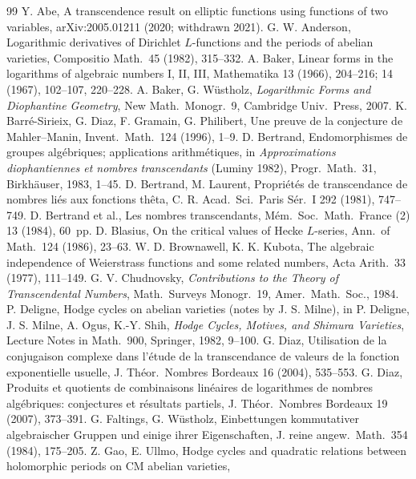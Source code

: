 \documentclass[11pt]{amsart}
\theoremstyle{definition}
\begin{document}
\begin{thebibliography}{99}
 Y. Abe, A transcendence result on elliptic functions using functions of two variables,
arXiv:2005.01211 (2020; withdrawn 2021).
 G. W. Anderson, Logarithmic derivatives of Dirichlet $L$-functions and the periods of abelian varieties,
Compositio Math.\ 45 (1982), 315--332.
 A. Baker, Linear forms in the logarithms of algebraic numbers I, II, III, Mathematika 13 (1966),
204--216; 14 (1967), 102--107, 220--228.
 A. Baker, G. W\"ustholz, \emph{Logarithmic Forms and Diophantine Geometry}, New Math.\ Monogr.\ 9,
Cambridge Univ.\ Press, 2007.
 K. Barr\'e-Sirieix, G. Diaz, F. Gramain, G. Philibert, Une preuve de la conjecture de Mahler--Manin,
Invent.\ Math.\ 124 (1996), 1--9.
 D. Bertrand, Endomorphismes de groupes alg\'ebriques; applications arithm\'etiques, in \emph{Approximations
diophantiennes et nombres transcendants} (Luminy 1982), Progr.\ Math.\ 31, Birkh\"auser, 1983, 1--45.
 D. Bertrand, M. Laurent, Propri\'et\'es de transcendance de nombres li\'es aux fonctions th\^eta, C. R.
Acad.\ Sci.\ Paris S\'er.\ I 292 (1981), 747--749.
 D. Bertrand et al., Les nombres transcendants, M\'em.\ Soc.\ Math.\ France (2) 13 (1984), 60~pp.
 D. Blasius, On the critical values of Hecke $L$-series, Ann.\ of Math.\ 124 (1986), 23--63.
 W. D. Brownawell, K. K. Kubota, The algebraic independence of Weierstrass functions and some related
numbers, Acta Arith.\ 33 (1977), 111--149.
 G. V. Chudnovsky, \emph{Contributions to the Theory of Transcendental Numbers}, Math.\ Surveys Monogr.\ 19,
Amer.\ Math.\ Soc., 1984.
 P. Deligne, Hodge cycles on abelian varieties (notes by J. S. Milne), in P. Deligne, J. S. Milne, A. Ogus,
K.-Y. Shih, \emph{Hodge Cycles, Motives, and Shimura Varieties}, Lecture Notes in Math.\ 900, Springer, 1982, 9--100.
 G. Diaz, Utilisation de la conjugaison complexe dans l'\'etude de la transcendance de valeurs de la
fonction exponentielle usuelle, J. Th\'eor.\ Nombres Bordeaux 16 (2004), 535--553.
 G. Diaz, Produits et quotients de combinaisons lin\'eaires de logarithmes de nombres alg\'ebriques:
conjectures et r\'esultats partiels, J. Th\'eor.\ Nombres Bordeaux 19 (2007), 373--391.
 G. Faltings, G. W\"ustholz, Einbettungen kommutativer algebraischer Gruppen und einige ihrer
Eigenschaften, J. reine angew.\ Math.\ 354 (1984), 175--205.
 Z. Gao, E. Ullmo, Hodge cycles and quadratic relations between holomorphic periods on CM abelian varieties,

\end{thebibliography}
\end{document}
